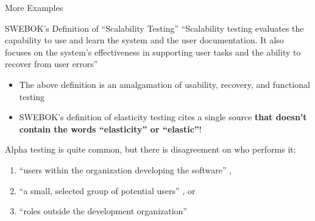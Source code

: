 \documentclass[22pt]{beamer}
\begin{document}
\begin{frame}[fragile]
\begin{textblock}{7.25}
\begin{block}{\fontsize{37}{20}\selectfont More Examples}
            \quad\\ %

            \begin{center}
                \begin{minipage}{.9\textwidth}
                    \begin{exampleblock}{SWEBOK's Definition of ``Scalability Testing''}
                        {\fontsize{28}{13}\selectfont
                            ``Scalability testing evaluates the capability to
                            use and learn the system and the user documentation.
                            It also focuses on the system's effectiveness in
                            supporting user tasks and the ability to recover
                            from user errors'' \cite[p.~5-9]{SWEBOK2024}}
                    \end{exampleblock}
                \end{minipage}
            \end{center}

            \begin{itemize}
                \item The above definition is an amalgamation of usability,
                      recovery, and functional testing
                \item SWEBOK's definition
                      of elasticity testing cites a single source \cite[p.~5-9]{SWEBOK2024}
                      \textbf{that doesn't contain the words ``elasticity'' or ``elastic''}!
            \end{itemize}

            \vspace{5mm}

            Alpha testing is quite common, but there is disagreement on who
            performs it:
            \begin{enumerate}
                \item ``users within the organization developing the software''
                      \cite[p.~17]{IEEE2017},
                \item ``a small, selected group of potential users''
                      \cite[p.~5-8]{SWEBOK2024}, or
                \item ``roles outside the development organization''
                      \cite{ISTQB}
            \end{enumerate}
            \vspace{5mm}
        \end{block}


\end{textblock}
\end{frame}
\end{document}
